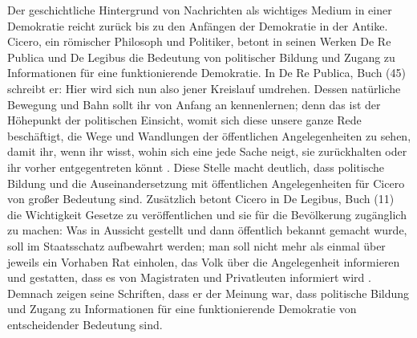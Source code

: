 \newcommand{\uproman}[1]{\uppercase\expandafter{\romannumeral#1}}
Der geschichtliche Hintergrund von Nachrichten als wichtiges Medium in einer Demokratie reicht zurück bis zu den Anfängen der Demokratie in der Antike.
Cicero, ein römischer Philosoph und Politiker, betont in seinen Werken \glqq De Re Publica\grqq{} und \glqq De Legibus\grqq{} die Bedeutung von politischer Bildung und Zugang zu Informationen für eine funktionierende Demokratie.
In De Re Publica, Buch \uproman{2}(45) schreibt er: \glqq Hier wird sich nun also jener Kreislauf umdrehen. Dessen natürliche Bewegung und Bahn sollt ihr von Anfang an kennenlernen; denn das ist der Höhepunkt der politischen Einsicht, womit sich diese unsere ganze Rede beschäftigt, die Wege und Wandlungen der öffentlichen Angelegenheiten zu sehen, damit ihr, wenn ihr wisst, wohin sich eine jede Sache neigt, sie zurückhalten oder ihr vorher entgegentreten könnt\grqq{} \cite{de-re-publica}.
Diese Stelle macht deutlich, dass politische Bildung und die Auseinandersetzung mit öffentlichen Angelegenheiten für Cicero von großer Bedeutung sind.
Zusätzlich betont Cicero in De Legibus, Buch \uproman{3}(11) die Wichtigkeit Gesetze zu veröffentlichen und sie für die Bevölkerung zugänglich zu machen: \glqq Was in Aussicht gestellt und dann öffentlich bekannt gemacht wurde, soll im Staatsschatz aufbewahrt werden; man soll nicht mehr als einmal über jeweils ein Vorhaben Rat einholen, das Volk über die Angelegenheit informieren und gestatten, dass es von Magistraten und Privatleuten informiert wird\grqq{} \cite{de-legibus}.
Demnach zeigen seine Schriften, dass er der Meinung war, dass politische Bildung und Zugang zu Informationen für eine funktionierende Demokratie von entscheidender Bedeutung sind.\\

